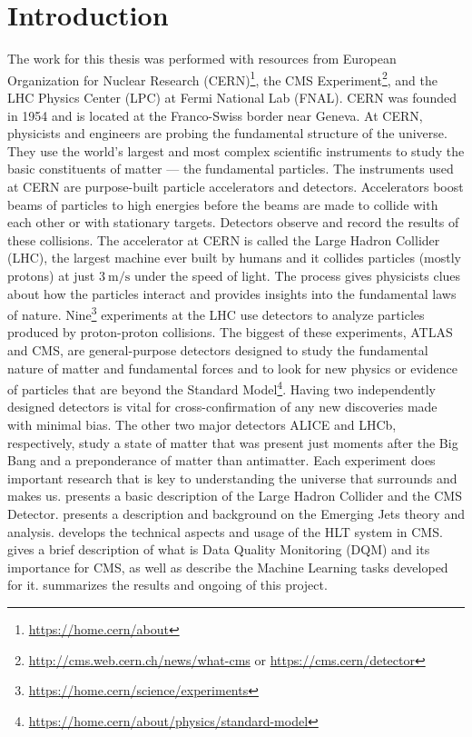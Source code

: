 \chapter{Introduction}

The work for this thesis was performed with resources from European Organization for Nuclear Research (CERN)\footnote{\url{https://home.cern/about}}, the CMS Experiment\footnote{\url{http://cms.web.cern.ch/news/what-cms} or \url{https://cms.cern/detector}}, and the LHC Physics Center (LPC) at Fermi National Lab (FNAL).
CERN was founded in 1954 and is located at the Franco-Swiss border near Geneva. At CERN, physicists and engineers are probing the fundamental structure of the universe. They use the world's largest and most complex scientific instruments to study the basic constituents of matter --- the fundamental particles.
The instruments used at CERN are purpose-built particle accelerators and detectors. Accelerators boost beams of particles to high energies before the beams are made to collide with each other or with stationary targets. Detectors observe and record the results of these collisions. The accelerator at CERN is called the Large Hadron Collider (LHC), the largest machine ever built by humans and it collides particles (mostly protons) at just
$\qty[per-mode = symbol]{3}{\meter\per\second}$ under the speed of light.
The process gives physicists clues about how the particles interact and provides insights into the fundamental laws of nature. Nine\footnote{\url{https://home.cern/science/experiments}} experiments at the LHC use detectors to analyze particles produced by proton-proton collisions.
The biggest of these experiments, ATLAS and CMS, are general-purpose detectors designed to study the
fundamental nature of matter and fundamental forces and to look for new physics or evidence of particles that are beyond the Standard Model\footnote{\url{https://home.cern/about/physics/standard-model}}. Having two independently designed detectors is vital for cross-confirmation of any new discoveries made with minimal bias. The other two major detectors ALICE and LHCb, respectively, study a state of matter that was present just moments after the Big Bang and a preponderance of matter than antimatter.  Each experiment does important research that is key to understanding the universe that surrounds and makes us.
 presents a basic description of the Large Hadron Collider and the CMS Detector.
 presents a description and background on the Emerging Jets theory and analysis.
 develops the technical aspects and usage of the HLT system in CMS.
 gives a brief description of what is Data Quality Monitoring (DQM) and its importance for CMS, as well as describe the Machine Learning tasks developed for it.
 summarizes the results and ongoing of this project.
